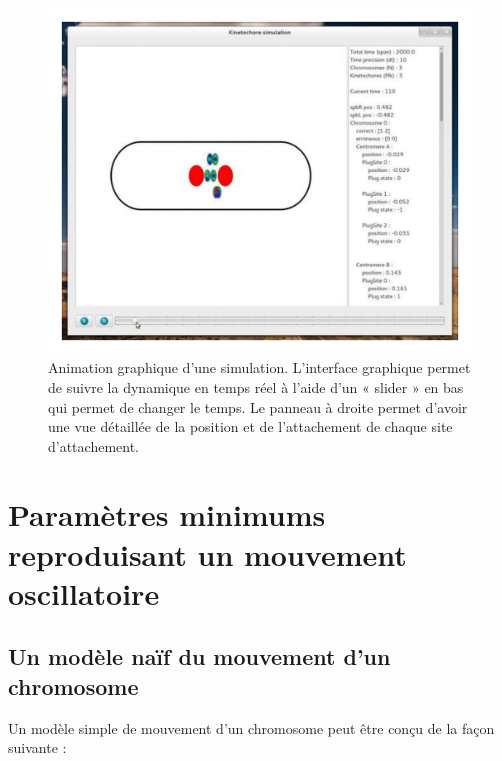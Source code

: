 \documentclass[12pt,a4paper,twoside,openright]{book}
\begin{document}
\begin{figure}[htbp]
\centering
\includegraphics{figures/annexes/gui.png}
\caption[Animation graphique d'une simulation]{\label{fig:kt-simul-gui}Animation
graphique d'une simulation. L'interface graphique permet de suivre la
dynamique en temps réel à l'aide d'un « slider » en bas qui permet de
changer le temps. Le panneau à droite permet d'avoir une vue détaillée
de la position et de l'attachement de chaque site d'attachement.}
\end{figure}

\section{Paramètres minimums reproduisant un mouvement
oscillatoire}\label{paramuxe8tres-minimums-reproduisant-un-mouvement-oscillatoire}

\label{sec:simu-oscillations}

\subsection{Un modèle naïf du mouvement d'un
chromosome}\label{un-moduxe8le-nauxeff-du-mouvement-dun-chromosome}

Un modèle simple de mouvement d'un chromosome peut être conçu de la
façon suivante :
\end{document}
